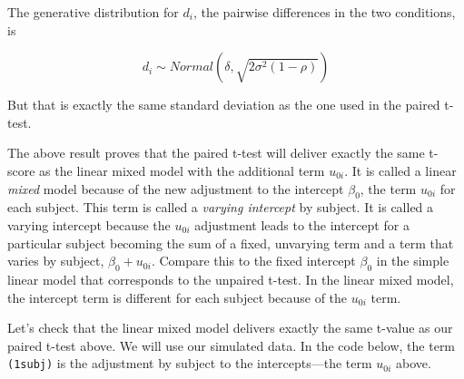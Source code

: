 \documentclass[
  12pt,
]{krantz}
\newenvironment{Shaded}{\begin{snugshade}}{\end{snugshade}}
\newcommand{\AttributeTok}[1]{\textcolor[rgb]{0.77,0.63,0.00}{#1}}
\newcommand{\DecValTok}[1]{\textcolor[rgb]{0.00,0.00,0.81}{#1}}
\newcommand{\DocumentationTok}[1]{\textcolor[rgb]{0.56,0.35,0.01}{\textbf{\textit{#1}}}}
\newcommand{\FunctionTok}[1]{\textcolor[rgb]{0.00,0.00,0.00}{#1}}
\newcommand{\NormalTok}[1]{#1}
\newcommand{\OtherTok}[1]{\textcolor[rgb]{0.56,0.35,0.01}{#1}}
\newcommand{\SpecialCharTok}[1]{\textcolor[rgb]{0.00,0.00,0.00}{#1}}
\newcommand{\StringTok}[1]{\textcolor[rgb]{0.31,0.60,0.02}{#1}}
\theoremstyle{definition}
\theoremstyle{definition}
\theoremstyle{definition}
\theoremstyle{definition}
\theoremstyle{remark}
\begin{document}
The generative distribution for \(d_i\), the pairwise differences in the two conditions, is

\begin{equation}
d_i \sim Normal(\delta, \sqrt{2\sigma^2(1-\rho)})
\end{equation}

But that is exactly the same standard deviation as the one used in the paired t-test.

The above result proves that the paired t-test will deliver exactly the same t-score as the linear mixed model with the additional term \(u_{0i}\). It is called a linear \emph{mixed} model because of the new adjustment to the intercept \(\beta_0\), the term \(u_{0i}\) for each subject. This term is called a \emph{varying intercept} by subject. It is called a varying intercept because the \(u_{0i}\) adjustment leads to the intercept for a particular subject becoming the sum of a fixed, unvarying term and a term that varies by subject, \(\beta_0 + u_{0i}\). Compare this to the fixed intercept \(\beta_0\) in the simple linear model that corresponds to the unpaired t-test. In the linear mixed model, the intercept term is different for each subject because of the \(u_{0i}\) term.

Let's check that the linear mixed model delivers exactly the same t-value as our paired t-test above. We will use our simulated data. In the code below, the term \texttt{(1\textbar{}subj)} is the adjustment by subject to the intercepts---the term \(u_{0i}\) above.

\begin{Shaded}
\end{Shaded}
\end{document}
